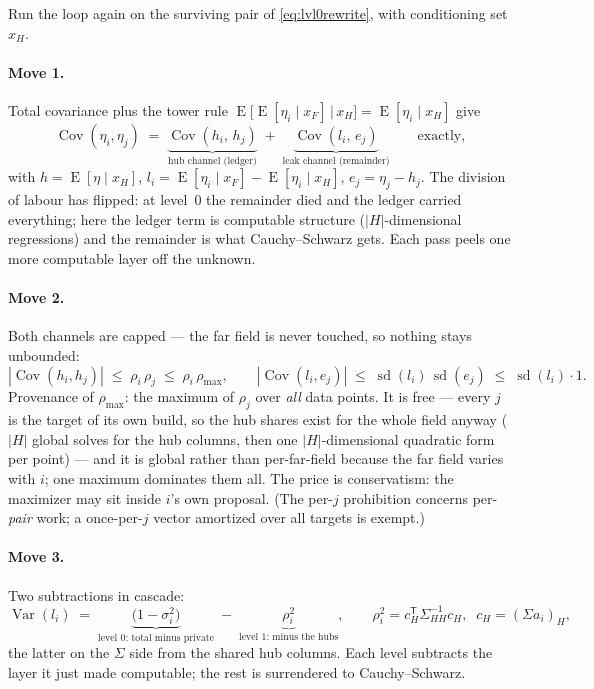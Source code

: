 \documentclass[11pt]{article}
\theoremstyle{remark}
\newcommand{\Var}{\operatorname{Var}}
\newcommand{\Cov}{\operatorname{Cov}}
\newcommand{\E}{\operatorname{E}}
\newcommand{\sd}{\operatorname{sd}}
\newcommand{\tr}{^{\mathsf T}}
\begin{document}
Run the loop again on the surviving pair of \eqref{eq:lvl0rewrite},
with conditioning set $x_H$.

\paragraph{Move 1.}  Total covariance plus the tower rule
$\E\bigl[\E[\eta_i\mid x_F]\,\big|\,x_H\bigr] = \E[\eta_i\mid x_H]$
give
\begin{equation}
  \Cov(\eta_i,\eta_j)
  \;=\;
  \underbrace{\Cov(h_i,\, h_j)}_{\text{hub channel (ledger)}}
  \;+\;
  \underbrace{\Cov(l_i,\, e_j)}_{\text{leak channel (remainder)}}
  \qquad\text{exactly,}
  \label{eq:lvl1rewrite}
\end{equation}
with $h = \E[\eta\mid x_H]$,
$l_i = \E[\eta_i\mid x_F] - \E[\eta_i\mid x_H]$,
$e_j = \eta_j - h_j$.  The division of labour has flipped: at level~0
the remainder died and the ledger carried everything; here the ledger
term is computable structure ($|H|$-dimensional regressions) and the
remainder is what Cauchy--Schwarz gets.  Each pass peels one more
computable layer off the unknown.

\paragraph{Move 2.}  Both channels are capped --- the far field is
never touched, so nothing stays unbounded:
\[
  |\Cov(h_i,h_j)| \;\le\; \rho_i\,\rho_j \;\le\; \rho_i\,\rho_{\max},
  \qquad
  |\Cov(l_i,e_j)| \;\le\; \sd(l_i)\,\sd(e_j) \;\le\; \sd(l_i)\cdot 1 .
\]
Provenance of $\rho_{\max}$: the maximum of $\rho_j$ over \emph{all}
data points.  It is free --- every $j$ is the target of its own build,
so the hub shares exist for the whole field anyway ($|H|$ global solves
for the hub columns, then one $|H|$-dimensional quadratic form per
point) --- and it is global rather than per-far-field because the far
field varies with $i$; one maximum dominates them all.  The price is
conservatism: the maximizer may sit inside $i$'s own proposal.  (The
per-$j$ prohibition concerns per-\emph{pair} work; a once-per-$j$
vector amortized over all targets is exempt.)

\paragraph{Move 3.}  Two subtractions in cascade:
\[
  \Var(l_i)
  \;=\; \underbrace{\bigl(1 - \sigma_i^2\bigr)}_{\text{level 0: total
  minus private}}
  \;-\; \underbrace{\rho_i^2}_{\text{level 1: minus the hubs}},
  \qquad
  \rho_i^2 = c_H\tr \Sigma_{HH}^{-1} c_H,\;\; c_H = (\Sigma a_i)_H ,
\]
the latter on the $\Sigma$ side from the shared hub columns.  Each
level subtracts the layer it just made computable; the rest is
surrendered to Cauchy--Schwarz.
\end{document}
